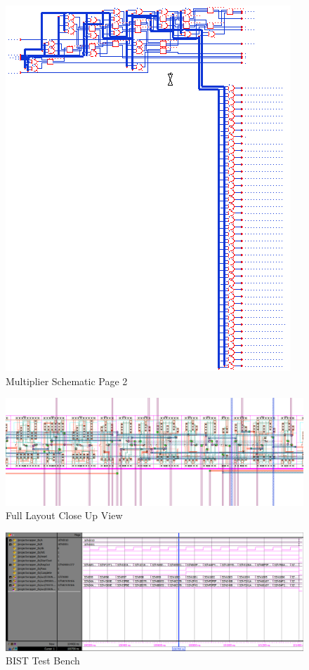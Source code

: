 \documentclass[11pt]{article}
\begin{document}
	
	\begin{figure}[H] 
		\centering 
		\includegraphics[width=0.7\linewidth]{"Pictures/Multiplier Schematic Page 2"}
		\caption{Multiplier Schematic Page 2} 
		\label{fig:Multiplier-Schematic-Page-2} 
	\end{figure}
	
	
	\begin{figure}[H] 
		\centering 
		\includegraphics[width=0.7\linewidth]{"Pictures/Full Layout Close Up View"}
		\caption{Full Layout Close Up View} 
		\label{fig:Full-Layout-Close-Up-View} 
	\end{figure}
	
	
	\begin{figure}[H] 
		\centering 
		\includegraphics[width=0.7\linewidth]{"Pictures/BIST-Test-Bench"}
		\caption{BIST Test Bench} 
		\label{fig:BIST-Test-Bench} 
	\end{figure}
	
\end{document}
